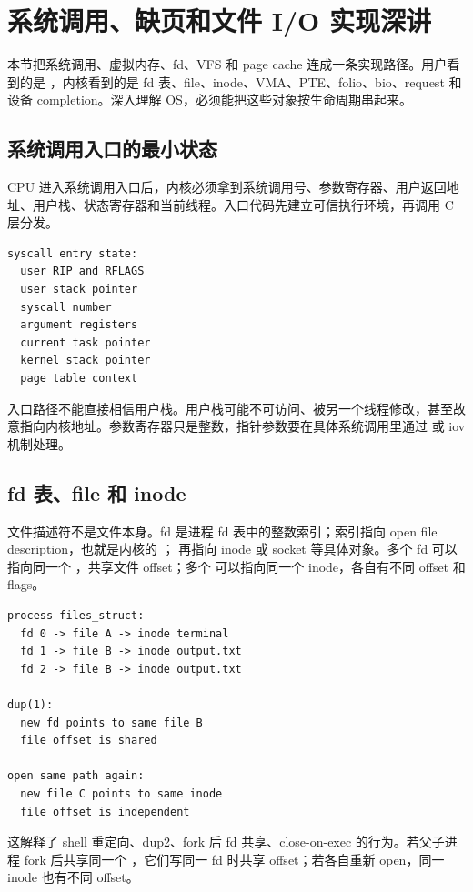 \section{系统调用、缺页和文件 I/O 实现深讲}

本节把系统调用、虚拟内存、fd、VFS 和 page cache 连成一条实现路径。用户看到的是 ，内核看到的是 fd 表、file、inode、VMA、PTE、folio、bio、request 和设备 completion。深入理解 OS，必须能把这些对象按生命周期串起来。

\subsection{系统调用入口的最小状态}

CPU 进入系统调用入口后，内核必须拿到系统调用号、参数寄存器、用户返回地址、用户栈、状态寄存器和当前线程。入口代码先建立可信执行环境，再调用 C 层分发。

\begin{lstlisting}
syscall entry state:
  user RIP and RFLAGS
  user stack pointer
  syscall number
  argument registers
  current task pointer
  kernel stack pointer
  page table context
\end{lstlisting}

入口路径不能直接相信用户栈。用户栈可能不可访问、被另一个线程修改，甚至故意指向内核地址。参数寄存器只是整数，指针参数要在具体系统调用里通过  或 iov 机制处理。

\subsection{fd 表、file 和 inode}

文件描述符不是文件本身。fd 是进程 fd 表中的整数索引；索引指向 open file description，也就是内核的 ； 再指向 inode 或 socket 等具体对象。多个 fd 可以指向同一个 ，共享文件 offset；多个  可以指向同一个 inode，各自有不同 offset 和 flags。

\begin{lstlisting}
process files_struct:
  fd 0 -> file A -> inode terminal
  fd 1 -> file B -> inode output.txt
  fd 2 -> file B -> inode output.txt

dup(1):
  new fd points to same file B
  file offset is shared

open same path again:
  new file C points to same inode
  file offset is independent
\end{lstlisting}

这解释了 shell 重定向、dup2、fork 后 fd 共享、close-on-exec 的行为。若父子进程 fork 后共享同一个 ，它们写同一 fd 时共享 offset；若各自重新 open，同一 inode 也有不同 offset。

